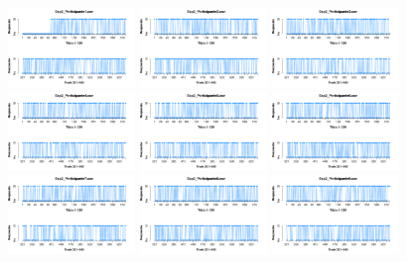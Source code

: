 \begin{figure}[th]
\centering
\includegraphics[width=0.30\textwidth]{Figures/Response_Exp2_P1} \includegraphics[width=0.30\textwidth]{Figures/Response_Exp2_P2} \includegraphics[width=0.30\textwidth]{Figures/Response_Exp2_P3}
\includegraphics[width=0.30\textwidth]{Figures/Response_Exp2_P4} \includegraphics[width=0.30\textwidth]{Figures/Response_Exp2_P5} \includegraphics[width=0.30\textwidth]{Figures/Response_Exp2_P6}
\includegraphics[width=0.30\textwidth]{Figures/Response_Exp2_P7} \includegraphics[width=0.30\textwidth]{Figures/Response_Exp2_P8} \includegraphics[width=0.30\textwidth]{Figures/Response_Exp2_P9}

\end{figure}
